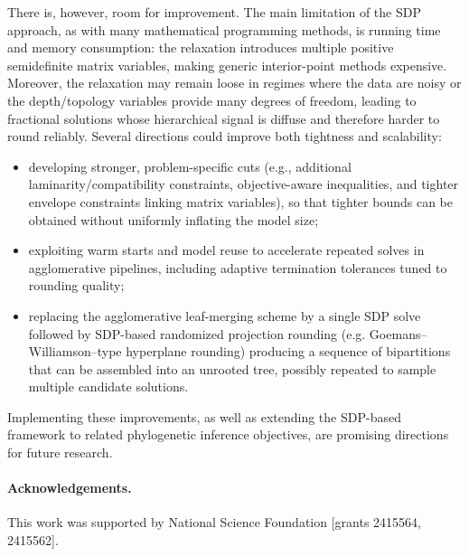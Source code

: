 \documentclass{article}
\begin{document}
There is, however, room for improvement. The main limitation of the SDP approach, as with many mathematical programming methods, is running time and memory consumption: the relaxation introduces multiple positive semidefinite matrix variables, making generic interior-point methods expensive. Moreover, the relaxation may remain loose in regimes where the data are noisy or the depth/topology variables provide many degrees of freedom, leading to fractional solutions whose hierarchical signal is diffuse and therefore harder to round reliably. Several directions could improve both tightness and scalability: 

\begin{itemize}
    \item[(i)] developing stronger, problem-specific cuts (e.g., additional laminarity/compatibility constraints, objective-aware inequalities, and tighter envelope constraints linking matrix variables), so that tighter bounds can be obtained without uniformly inflating the model size;

    \item[(ii)] exploiting warm starts and model reuse to accelerate repeated solves in agglomerative pipelines, including adaptive termination tolerances tuned to rounding quality;

    \item[(iii)]  replacing the agglomerative leaf-merging scheme by a single SDP solve followed by SDP-based randomized projection rounding (e.g. Goemans–Williamson–type hyperplane rounding) producing a sequence of bipartitions that can be assembled into an unrooted tree, possibly repeated to sample multiple candidate solutions. 
\end{itemize}

\noindent
Implementing these improvements, as well as extending the SDP-based framework to related phylogenetic inference objectives, are promising directions for future research.

\paragraph{Acknowledgements.} This work was supported by National Science Foundation [grants 2415564, 2415562]. 



\end{document}
